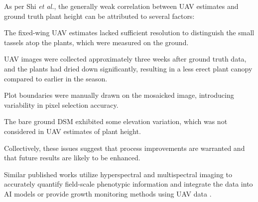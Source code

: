 As per Shi \textit{et al.}\cite{UAV_HTPAR_2016}, the generally weak correlation between UAV estimates and ground truth plant height can be attributed to several factors:

The fixed-wing UAV estimates lacked sufficient resolution to distinguish the small tassels atop the plants, which were measured on the ground.

UAV images were collected approximately three weeks after ground truth data, and the plants had dried down significantly, resulting in a less erect plant canopy compared to earlier in the season.

Plot boundaries were manually drawn on the mosaicked image, introducing variability in pixel selection accuracy.

The bare ground DSM exhibited some elevation variation, which was not considered in UAV estimates of plant height.

Collectively, these issues suggest that process improvements are warranted and that future results are likely to be enhanced.

Similar published works utilize hyperspectral and multispectral imaging to accurately quantify field-scale phenotypic information and integrate the data into AI models \cite{jung2021potential} or provide growth monitoring methods using UAV data \cite{chang2017crop}.